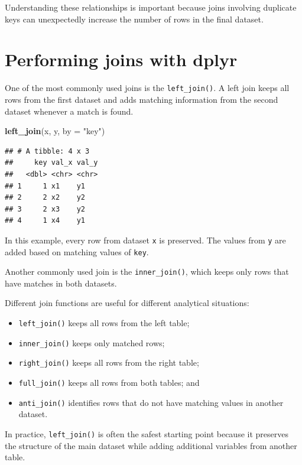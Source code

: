 \documentclass[
  11pt,
  oneside]{book}
\newenvironment{Shaded}{\begin{snugshade}}{\end{snugshade}}
\newcommand{\AttributeTok}[1]{\textcolor[rgb]{0.13,0.29,0.53}{#1}}
\newcommand{\FunctionTok}[1]{\textcolor[rgb]{0.13,0.29,0.53}{\textbf{#1}}}
\newcommand{\NormalTok}[1]{#1}
\newcommand{\StringTok}[1]{\textcolor[rgb]{0.31,0.60,0.02}{#1}}
\providecommand{\tightlist}{%
  \setlength{\itemsep}{0pt}\setlength{\parskip}{0pt}}
\begin{document}
Understanding these relationships is important because joins involving duplicate keys can unexpectedly increase the number of rows in the final dataset.

\section{Performing joins with dplyr}\label{performing-joins-with-dplyr}

One of the most commonly used joins is the \texttt{left\_join()}. A left join keeps all rows from the first dataset and adds matching information from the second dataset whenever a match is found.

\begin{Shaded}
\begin{Highlighting}[]
\FunctionTok{left\_join}\NormalTok{(x, y, }\AttributeTok{by =} \StringTok{"key"}\NormalTok{)}
\end{Highlighting}
\end{Shaded}

\begin{verbatim}
## # A tibble: 4 x 3
##     key val_x val_y
##   <dbl> <chr> <chr>
## 1     1 x1    y1   
## 2     2 x2    y2   
## 3     2 x3    y2   
## 4     1 x4    y1
\end{verbatim}

In this example, every row from dataset \texttt{x} is preserved. The values from \texttt{y} are added based on matching values of \texttt{key}.

Another commonly used join is the \texttt{inner\_join()}, which keeps only rows that have matches in both datasets.

Different join functions are useful for different analytical situations:

\begin{itemize}
\tightlist
\item
  \texttt{left\_join()} keeps all rows from the left table;
\item
  \texttt{inner\_join()} keeps only matched rows;
\item
  \texttt{right\_join()} keeps all rows from the right table;
\item
  \texttt{full\_join()} keeps all rows from both tables; and
\item
  \texttt{anti\_join()} identifies rows that do not have matching values in another dataset.
\end{itemize}

In practice, \texttt{left\_join()} is often the safest starting point because it preserves the structure of the main dataset while adding additional variables from another table.
\end{document}
